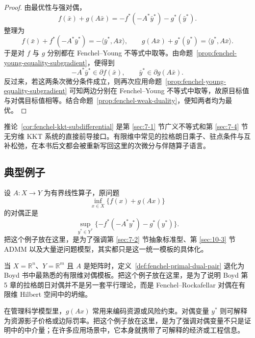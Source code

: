 \begin{proof}
由最优性与强对偶，
\[
f(\bar x)+g(A\bar x)
=
-f^\ast(-A^\ast \bar y^\ast)-g^\ast(\bar y^\ast).
\]
整理为
\[
f(\bar x)+f^\ast(-A^\ast \bar y^\ast)
=
-\langle \bar y^\ast,A\bar x\rangle,
\qquad
g(A\bar x)+g^\ast(\bar y^\ast)
=
\langle \bar y^\ast,A\bar x\rangle.
\]
于是对 $f$ 与 $g$ 分别都在 Fenchel--Young 不等式中取等。由命题~\ref{prop:fenchel-young-equality-subgradient}，便得到
\[
-A^\ast \bar y^\ast\in \partial f(\bar x),
\qquad
\bar y^\ast\in \partial g(A\bar x).
\]
反过来，若这两条次微分条件成立，则再次应用命题~\ref{prop:fenchel-young-equality-subgradient} 可知两边分别在 Fenchel--Young 不等式中取等，故原目标值与对偶目标值相等。结合命题~\ref{prop:fenchel-weak-duality}，便知两者均为最优。
\end{proof}

\begin{remark}
推论~\ref{cor:fenchel-kkt-subdifferential} 是第 \ref{sec:7-1} 节广义不等式和第 \ref{sec:7-4} 节无穷维 KKT 系统的直接前导接口。有限维中常见的拉格朗日乘子、驻点条件与互补松弛，在本书后文都会被重新写回这里的次微分与伴随算子语言。
\end{remark}

\subsection{典型例子}

\begin{example}
设 $A\colon X\to Y$ 为有界线性算子，原问题
\[
\inf_{x\in X}\{f(x)+g(Ax)\}
\]
的对偶正是
\[
\sup_{y^\ast\in Y^\ast}\{-f^\ast(-A^\ast y^\ast)-g^\ast(y^\ast)\}.
\]
把这个例子放在这里，是为了强调第 \ref{sec:7-2} 节抽象标准型、第 \ref{sec:10-3} 节 ADMM 以及大量逆问题模型，其实都只是这一统一模板的具体化。
\end{example}

\begin{example}[有限维拉格朗日对偶]
当 $X=\mathbb R^n$、$Y=\mathbb R^m$ 且 $A$ 是矩阵时，定义~\ref{def:fenchel-primal-dual-pair} 退化为 Boyd 书中最熟悉的有限维对偶模板。把这个例子放在这里，是为了说明 Boyd 第 5 章的拉格朗日对偶并不是另一套平行理论，而是 Fenchel--Rockafellar 对偶在有限维 Hilbert 空间中的坍缩。
\end{example}

\begin{example}[资源约束的价差解释]
在管理科学模型里，$g(Ax)$ 常用来编码资源或风险约束。对偶变量 $y^\ast$ 则可解释为资源影子价格或边际罚率。把这个例子放在这里，是为了强调对偶变量不只是证明中的中介量；在许多应用场景中，它本身就携带了可解释的经济或工程信息。
\end{example}

